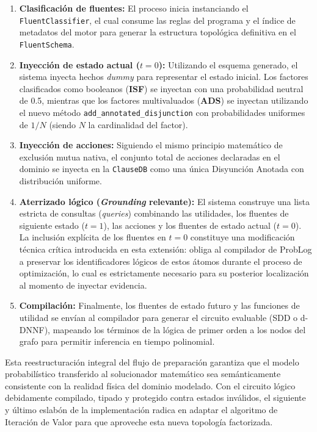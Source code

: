 \begin{enumerate}
    \item \textbf{Clasificación de fluentes:} El proceso inicia instanciando el \texttt{FluentClassifier}, el cual consume las reglas del programa y el índice de metadatos del motor para generar la estructura topológica definitiva en el \texttt{FluentSchema}.
    
    \item \textbf{Inyección de estado actual ($t=0$):} Utilizando el esquema generado, el sistema inyecta hechos \textit{dummy} para representar el estado inicial. Los factores clasificados como booleanos (\textbf{ISF}) se inyectan con una probabilidad neutral de 0.5, mientras que los factores multivaluados (\textbf{ADS}) se inyectan utilizando el nuevo método \texttt{add\_annotated\_disjunction} con probabilidades uniformes de $1/N$ (siendo $N$ la cardinalidad del factor).
    
    \item \textbf{Inyección de acciones:} Siguiendo el mismo principio matemático de exclusión mutua nativa, el conjunto total de acciones declaradas en el dominio se inyecta en la \texttt{ClauseDB} como una única Disyunción Anotada con distribución uniforme.
    
    \item \textbf{Aterrizado lógico (\textit{Grounding} relevante):} El sistema construye una lista estricta de consultas (\textit{queries}) combinando las utilidades, los fluentes de siguiente estado ($t=1$), las acciones y los fluentes de estado actual ($t=0$). La inclusión explícita de los fluentes en $t=0$ constituye una modificación técnica crítica introducida en esta extensión: obliga al compilador de ProbLog a preservar los identificadores lógicos de estos átomos durante el proceso de optimización, lo cual es estrictamente necesario para su posterior localización al momento de inyectar evidencia.
    
    \item \textbf{Compilación:} Finalmente, los fluentes de estado futuro y las funciones de utilidad se envían al compilador para generar el circuito evaluable (SDD o d-DNNF), mapeando los términos de la lógica de primer orden a los nodos del grafo para permitir inferencia en tiempo polinomial.
\end{enumerate}

Esta reestructuración integral del flujo de preparación garantiza que el modelo probabilístico transferido al solucionador matemático sea semánticamente consistente con la realidad física del dominio modelado. Con el circuito lógico debidamente compilado, tipado y protegido contra estados inválidos, el siguiente y último eslabón de la implementación radica en adaptar el algoritmo de Iteración de Valor para que aproveche esta nueva topología factorizada.


